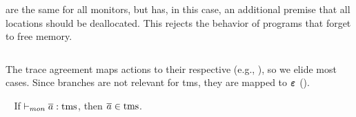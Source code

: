 \documentclass[dvipsnames]{llncs}
\begin{document}
 are the same for all monitors, but  has, in this case, an additional premise that all locations should be deallocated.
This rejects the behavior of programs that forget to free memory.

\begin{center}\small
  $\;$\\
\end{center}

The trace agreement maps actions to their respective (e.g., ), so we elide most cases.
% 
Since branches are not relevant for \gls*{tms}, they are mapped to $\bm{\mathit{\varepsilon}}$ ().

\begin{lemma}\label{lem:mon:tmssafe}
  $\;\;$ If $\vdash_{mon}{\overline{a}}:{\operatorname{tms}}$, then $\overline{a}\in\operatorname{tms}$. %
\end{lemma}
\end{document}
